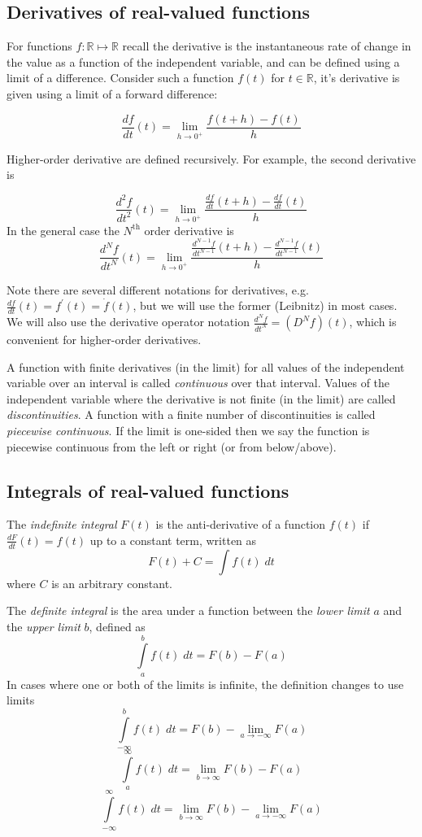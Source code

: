 \subsection*{Derivatives of real-valued functions}

For functions $f:\mathbb{R}\mapsto\mathbb{R}$ recall the derivative is the instantaneous rate of change in the value as a function of the independent variable, and can be defined using a limit of a difference. Consider such a function $f(t)$ for $t\in\mathbb{R}$, it's derivative is given using a limit of a forward difference:

\[
\frac{df}{dt} (t) = \lim_{h\rightarrow0^+} \frac{f(t+h)-f(t)}{h}
\]

Higher-order derivative are defined recursively. For example, the second derivative is

\[
\frac{d^2f}{dt^2} (t) = \lim_{h\rightarrow0^+} \frac{\frac{df}{dt}(t+h)-\frac{df}{dt}(t)}{h}
\]
In the general case the $N^\text{th}$ order derivative is
\[
\frac{d^Nf}{dt^N} (t) = \lim_{h\rightarrow0^+} \frac{\frac{d^{N-1}f}{dt^{N-1}}(t+h)-\frac{d^{N-1}f}{dt^{N-1}}(t)}{h}
\]

Note there are several different notations for derivatives, e.g. $\frac{df}{dt}(t) = f^\prime (t) = \dot{f}(t)$, but we will use the former (Leibnitz) in most cases. We will also use the derivative operator notation $\frac{d^Nf}{dt^N} = (D^N f)(t)$, which is convenient for higher-order derivatives.

A function with finite derivatives (in the limit) for all values of the independent variable over an interval is called \textit{continuous} over that interval. Values of the independent variable where the derivative is not finite (in the limit) are called \textit{discontinuities}. A function with a finite number of discontinuities is called \textit{piecewise continuous}. If the limit is one-sided then we say the function is piecewise continuous from the left or right (or from below/above).

\subsection*{Integrals of real-valued functions}

The \textit{indefinite integral} $F(t)$ is the anti-derivative of a function $f(t)$ if $\frac{dF}{dt}(t) = f(t)$ up to a constant term, written as
\[
F(t) + C = \int f(t)\; dt
\]
where $C$ is an arbitrary constant.

The \textit{definite integral} is the area under a function between the \textit{lower limit} $a$ and the \textit{upper limit} $b$, defined as
\[
\int\limits_{a}^{b} f(t) \; dt = F(b) - F(a)
\]
In cases where one or both of the limits is infinite, the definition changes to use limits
\[
\int\limits_{-\infty}^{b} f(t) \; dt = F(b) - \lim_{a\rightarrow -\infty} F(a)
\]
\[
\int\limits_{a}^{\infty} f(t) \; dt = \lim_{b\rightarrow \infty} F(b) - F(a)
\]
\[
\int\limits_{-\infty}^{\infty} f(t) \; dt = \lim_{b\rightarrow \infty} F(b) - \lim_{a\rightarrow -\infty} F(a)
\]

